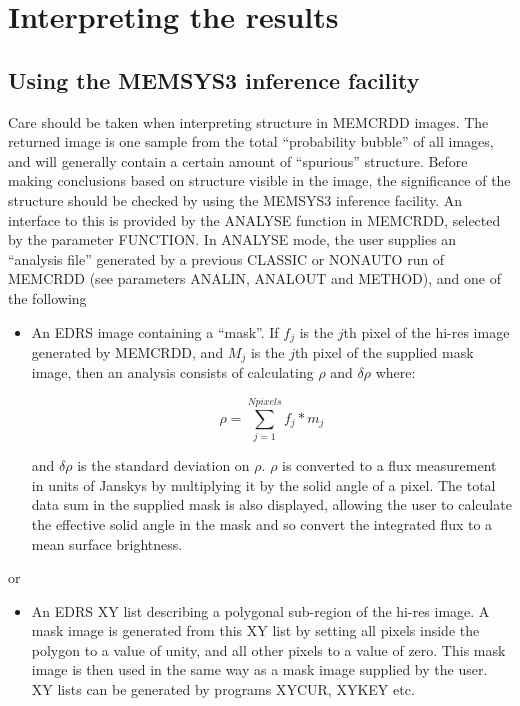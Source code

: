 \section {Interpreting the results}
\subsection {Using the MEMSYS3 inference facility}
\label {SEC:INFER}

Care should be taken when interpreting structure in MEMCRDD images. The
returned  image is one sample from the total ``probability bubble'' of all
images, and  will generally contain a certain amount of ``spurious'' structure.
Before making  conclusions based on structure visible in the image, the
significance of the  structure should be checked by using the MEMSYS3 inference
facility. An  interface to this is provided by the ANALYSE function in MEMCRDD,
selected by the parameter FUNCTION. In ANALYSE mode, the user supplies an
``analysis  file'' generated by a previous CLASSIC or NONAUTO run of MEMCRDD
(see parameters ANALIN, ANALOUT and METHOD), and one of the following

\begin{itemize}
\item An EDRS image containing a ``mask''. If $f_{j}$ is the $j$th pixel of
the hi-res image generated by MEMCRDD, and $M_{j}$ is the $j$th pixel of the 
supplied mask image, then an analysis consists of calculating $\rho$ and 
$\delta\rho$ where:

\begin{equation}
\rho=\sum_{j=1}^{Npixels} f_{j}*m_{j}
\end{equation}

and $\delta\rho$ is the standard deviation on $\rho$. $\rho$ is converted to  a
flux measurement in units of Janskys by multiplying it by the solid angle of a 
pixel. The total data sum in the supplied mask is also displayed, allowing the 
user to calculate the effective solid angle in the mask and so convert the 
integrated flux to a mean surface brightness.

\end{itemize}

or

\begin{itemize}
\item An EDRS XY list describing a polygonal sub-region of the hi-res image. A
mask  image is generated from this XY list by setting all pixels inside the
polygon to  a value of unity, and all other pixels to a value of zero. This
mask image is  then used in the same way as a mask image supplied by the user.
XY lists can be  generated by programs XYCUR, XYKEY etc.
\end{itemize}


